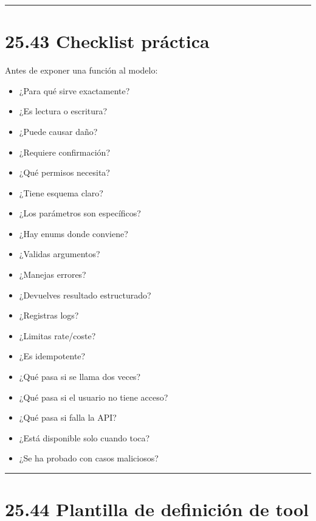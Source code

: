 \begin{center}\rule{0.5\linewidth}{0.5pt}\end{center}

\section{25.43 Checklist práctica}\label{checklist-pruxe1ctica-24}

Antes de exponer una función al modelo:

\begin{itemize}
\tightlist
\item
  ¿Para qué sirve exactamente?
\item
  ¿Es lectura o escritura?
\item
  ¿Puede causar daño?
\item
  ¿Requiere confirmación?
\item
  ¿Qué permisos necesita?
\item
  ¿Tiene esquema claro?
\item
  ¿Los parámetros son específicos?
\item
  ¿Hay enums donde conviene?
\item
  ¿Validas argumentos?
\item
  ¿Manejas errores?
\item
  ¿Devuelves resultado estructurado?
\item
  ¿Registras logs?
\item
  ¿Limitas rate/coste?
\item
  ¿Es idempotente?
\item
  ¿Qué pasa si se llama dos veces?
\item
  ¿Qué pasa si el usuario no tiene acceso?
\item
  ¿Qué pasa si falla la API?
\item
  ¿Está disponible solo cuando toca?
\item
  ¿Se ha probado con casos maliciosos?
\end{itemize}

\begin{center}\rule{0.5\linewidth}{0.5pt}\end{center}

\section{25.44 Plantilla de definición de
tool}\label{plantilla-de-definiciuxf3n-de-tool}


